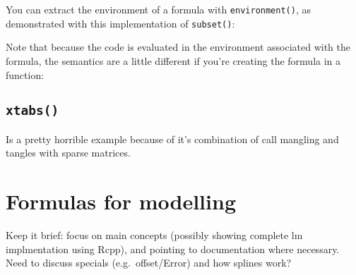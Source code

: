 You can extract the environment of a formula with
\texttt{environment()}, as demonstrated with this implementation of
\texttt{subset()}:

\begin{Shaded}
\begin{Highlighting}[]
\StringTok{ }
  \NormalTok{(}\NormalTok{), }\OperatorTok{==}\StringTok{ }\NormalTok{)}
\StringTok{ }\NormalTok{(f[[}\NormalTok{]], x, }
\NormalTok{\}}
\OperatorTok{~}\StringTok{ }\OperatorTok{==}\StringTok{ }\NormalTok{)}
\end{Highlighting}
\end{Shaded}

Note that because the code is evaluated in the environment associated
with the formula, the semantics are a little different if you're
creating the formula in a function:

\begin{Shaded}
\begin{Highlighting}[]
\StringTok{ }\OperatorTok{~}\StringTok{ }\OperatorTok{==}\StringTok{ }
\NormalTok{(}\NormalTok{))}
\end{Highlighting}
\end{Shaded}

\hypertarget{xtabs}{%
\subsection{\texorpdfstring{\texttt{xtabs()}}{xtabs()}}\label{xtabs}}

Is a pretty horrible example because of it's combination of call
mangling and tangles with sparse matrices.

\hypertarget{formulas-for-modelling}{%
\section{Formulas for modelling}\label{formulas-for-modelling}}

Keep it brief: focus on main concepts (possibly showing complete lm
implmentation using Rcpp), and pointing to documentation where
necessary. Need to discuss specials (e.g.~offset/Error) and how splines
work?

